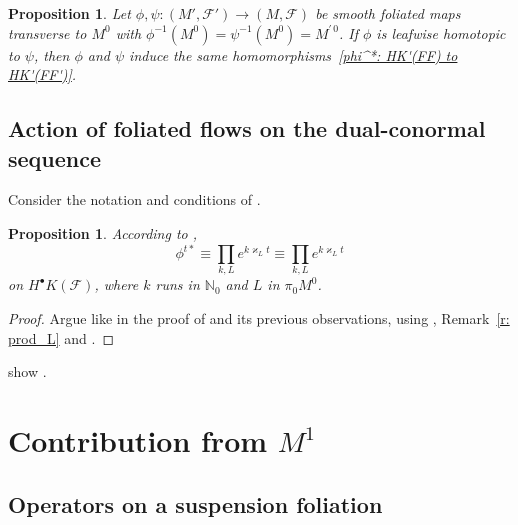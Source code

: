 \documentclass{memo-l}
\theoremstyle{plain}
\newtheorem{prop}[thm]{Proposition}
\theoremstyle{definition}
\theoremstyle{remark}
\newcommand{\N}{\mathbb{N}}
\newcommand{\FF}{\mathcal{F}}
\numberwithin{section}{chapter}
\numberwithin{equation}{section}%
\begin{document}
\begin{prop}\label{p: leafwise homotopy invariance - H^bullet K'(FF)}
 Let $\phi,\psi:(M',\FF')\to(M,\FF)$ be smooth foliated maps transverse to $M^0$ with $\phi^{-1}(M^0)=\psi^{-1}(M^0)=M^{\prime\,0}$. If $\phi$ is leafwise homotopic to $\psi$, then $\phi$ and $\psi$ induce the same homomorphisms~\eqref{phi^*: HK'(FF) to HK'(FF')}.
\end{prop}



\section{Action of foliated flows on the dual-conormal sequence}\label{s: action of foliated flows on the dual-conormal seq}

Consider the notation and conditions of .

\begin{prop}\label{p: phi^t* equiv prod_L k e^k varkappa_L t}
According to ,
\[
\phi^{t*}\equiv\prod_{k,L}e^{k\varkappa_Lt}\equiv\prod_{k,L}e^{k\varkappa_Lt}
\]
on $H^\bullet K(\FF)$, where $k$ runs in $\N_0$ and $L$ in $\pi_0M^0$.
\end{prop}

\begin{proof}
Argue like in the proof of  and its previous observations, using , Remark~\ref{r: prod_L} and .
\end{proof}

 show .




\chapter{Contribution from $M^1$}\label{ch: contribution from M^1}


\section{Operators on a suspension foliation}\label{s: opers suspension}
\end{document}
